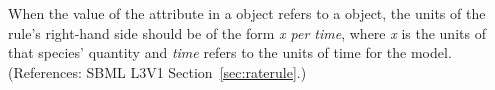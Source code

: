 When the value of the attribute  in a \RateRule object
refers to a \Species object, the units of the rule's right-hand side should
be of the form \emph{x per time}, where \emph{x} is the units of that
species' quantity and \emph{time} refers to the units of time for the
model.  (References: SBML L3V1 Section~\ref{sec:raterule}.)
